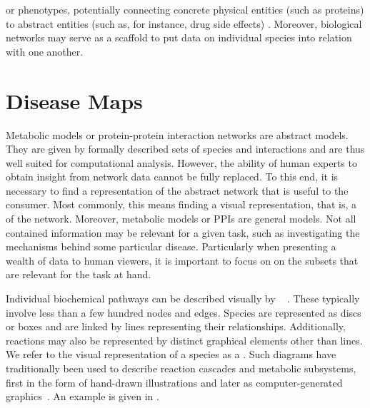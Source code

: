 \documentclass[
	fontsize=10pt, %
	twoside=false, %
	secnumdepth=1, %
  toc=indentunnumbered %
]{kaobook}
\begin{document}
or phenotypes, potentially connecting concrete physical entities (such as
proteins) to abstract entities (such as, for instance, drug side effects)
\cite{ruiz_identification_2021, barabasi_NetworkMedicineNetworkbased_2011}.
Moreover, biological networks
may serve as a scaffold to put data on individual species into relation with one
another.

\section{Disease Maps}


Metabolic models or protein-protein interaction networks are abstract models.
They are given by formally described sets of species and interactions and are
thus well suited for computational analysis. However, the ability of human
experts to obtain insight from network data cannot be fully replaced. To this
end, it is necessary to find a representation of the abstract network that is
useful to the consumer. Most commonly, this means finding a visual
representation, that is, a  of the network. Moreover, metabolic
models or PPIs are general models. Not all contained information may be relevant
for a given task, such as investigating the mechanisms behind some particular
disease. Particularly when presenting a wealth of data to human viewers, it is
important to focus on on the subsets that are relevant for the task at hand.

Individual biochemical pathways can be described visually by ~\cite{siebenhaller_HumanlikeLayoutAlgorithms_2020} .
These typically involve less than a few hundred nodes and edges. Species are
represented as discs or boxes and are linked by lines representing their
relationships. Additionally, reactions may also be represented by distinct
graphical elements other than lines. We refer to the visual representation of a
species as a . Such diagrams have traditionally been used to
describe reaction cascades and metabolic subsystems, first in the form of
hand-drawn illustrations and later as computer-generated
graphics~\cite{becker_GraphLayoutAlgorithm_2001,paley_PathwayToolsCellular_2006,droste_SemiautomaticDrawingMetabolic_2012}. An example is given in .
\end{document}
